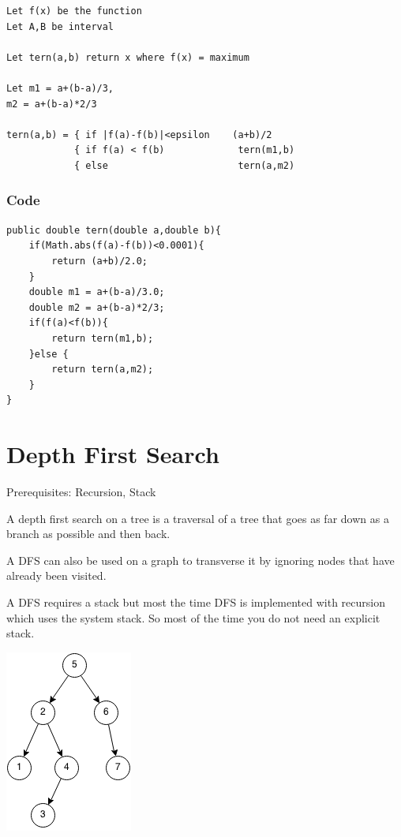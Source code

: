 \documentclass[11pt,oneside]{book}
\makeatletter
\def\maxwidth#1{\ifdim\Gin@nat@width>#1 #1\else\Gin@nat@width\fi}
\makeatother
\begin{document}
\begin{lstlisting}
Let f(x) be the function 
Let A,B be interval

Let tern(a,b) return x where f(x) = maximum

Let m1 = a+(b-a)/3,
m2 = a+(b-a)*2/3

tern(a,b) = { if |f(a)-f(b)|<epsilon    (a+b)/2 
            { if f(a) < f(b)             tern(m1,b)
            { else                       tern(a,m2)
\end{lstlisting}

\subsubsection{Code}

\begin{lstlisting}
public double tern(double a,double b){
    if(Math.abs(f(a)-f(b))<0.0001){
        return (a+b)/2.0;
    }
    double m1 = a+(b-a)/3.0;
    double m2 = a+(b-a)*2/3;
    if(f(a)<f(b)){
        return tern(m1,b);
    }else {
        return tern(a,m2);
    }
}
\end{lstlisting}
\section{Depth First Search}

Prerequisites: Recursion, Stack

A depth first search on a tree is a traversal of a tree that goes as far down as a branch as possible and then back.

A DFS can also be used on a graph to transverse it by ignoring nodes that have already been visited.

A DFS requires a stack but most the time DFS is implemented with recursion which uses the system stack. So most of the time you do not need an explicit stack.

\includegraphics[width=\maxwidth{\textwidth}]{dfs.png}
\end{document}
